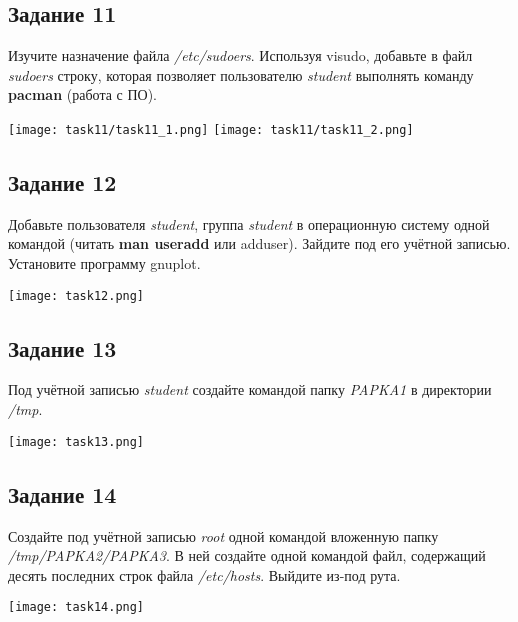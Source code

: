 \documentclass[12pt, a4paper]{report}
\begin{document}
			\subsection*{Задание 11}
			Изучите назначение файла \textit{/etc/sudoers}. Используя visudo, добавьте в файл \textit{sudoers} строку, которая позволяет пользователю \textit{student} выполнять команду \textbf{pacman} (работа с ПО).
			\begin{center}
				\texttt{[image: task11/task11\_1.png]}
				\texttt{[image: task11/task11\_2.png]}
			\end{center}
	
			\subsection*{Задание 12}
			Добавьте пользователя \textit{student}, группа \textit{student} в операционную систему одной командой (читать \textbf{man useradd} или adduser). Зайдите под его учётной записью. Установите программу gnuplot.
			\lstset{style=mystyle}
			
			\begin{center}
				\texttt{[image: task12.png]}
			\end{center}

			\subsection*{Задание 13}
			Под учётной записью \textit{student} создайте командой папку \textit{PAPKA1} в директории \textit{/tmp}.
			\lstset{style=mystyle}
			
			\begin{center}
				\texttt{[image: task13.png]}
			\end{center}

			\subsection*{Задание 14}
			Создайте под учётной записью \textit{root} одной командой вложенную папку \textit{/tmp/PAPKA2/PAPKA3}. В ней создайте одной командой файл, содержащий десять последних строк файла \textit{/etc/hosts}. Выйдите из-под рута.
			\lstset{style=mystyle}
			
			\begin{center}
				\texttt{[image: task14.png]}
			\end{center}
\end{document}
